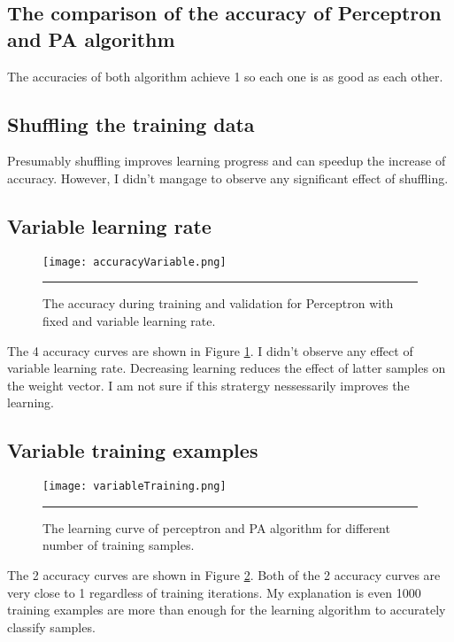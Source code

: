 \documentclass[12pt]{article}
\begin{document}
\subsection{The comparison of the accuracy of Perceptron and PA algorithm}
The accuracies of both algorithm achieve 1 so each one is as good as each other.
\subsection{Shuffling the training data}
Presumably shuffling improves learning progress and can speedup the increase of accuracy. However, I didn't mangage to observe any significant effect of shuffling.
\subsection{Variable learning rate}
\begin{figure}[htb]
  \centering
      {\texttt{[image: accuracyVariable.png]}} \rule{1\linewidth}{1pt}
      \caption{The accuracy during training and validation for Perceptron with fixed and variable learning rate.}
      \label{fig:accuracyVariable}
\end{figure}
The 4 accuracy curves are shown in Figure \ref{fig:accuracyVariable}. I didn't observe any effect of variable learning rate. Decreasing learning reduces the effect of latter samples on the weight vector. I am not sure if this stratergy nessessarily improves the learning.
\subsection{Variable training examples}
\begin{figure}[htb]
  \centering
      {\texttt{[image: variableTraining.png]}} \rule{1\linewidth}{1pt}
      \caption{The learning curve of perceptron and PA algorithm for different number of training samples.}
      \label{fig:variableTraining}
\end{figure}
The 2 accuracy curves are shown in Figure \ref{fig:variableTraining}. Both of the 2 accuracy curves are very close to 1 regardless of training iterations. My explanation is even 1000 training examples are more than enough for the learning algorithm to accurately classify samples.
\end{document}
